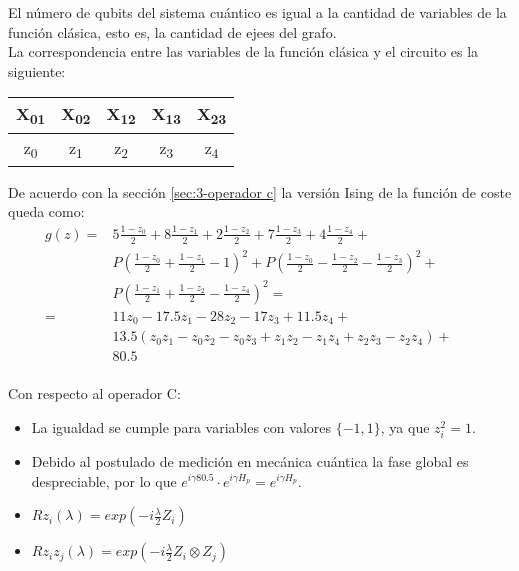 \documentclass{article}
\begin{document}
El número de qubits del sistema cuántico es igual a la cantidad de variables de la función clásica, esto es, la cantidad de ejees del grafo. \\
La correspondencia entre las variables de la función clásica y el circuito es la siguiente:

\begin{center}
  \begin{tabular}{|c|c|c|c|c|}
    \hline
    X\textsubscript{01} & X\textsubscript{02} & X\textsubscript{12} & X\textsubscript{13} & X\textsubscript{23}\\
    \hline
    z\textsubscript{0} & z\textsubscript{1} & z\textsubscript{2} & z\textsubscript{3} & z\textsubscript{4}\\
    \hline
  \end{tabular}
\end{center}

De acuerdo con la sección \ref{sec:3-operador c}  %
la versión Ising de la función de coste queda como:
\begin{align*}
  g(z) = &5\frac{1-z_0}{2} + 8\frac{1-z_1}{2} + 2\frac{1-z_2}{2} + 7\frac{1-z_3}{2} + 4\frac{1-z_4}{2} + &&\\
         &P(\frac{1-z_0}{2} + \frac{1-z_1}{2} - 1)^2 + P(\frac{1-z_0}{2} - \frac{1-z_2}{2} - \frac{1-z_3}{2})^2 + \\
         &P(\frac{1-z_1}{2} + \frac{1-z_2}{2} - \frac{1-z_4}{2})^2 = \\
  = & 11z_0 - 17.5z_1 - 28z_2 - 17z_3 + 11.5z_4 + \\
         &13.5(z_0z_1 - z_0z_2 - z_0z_3 + z_1z_2 - z_1z_4 + z_2z_3 - z_2z_4) + \\
         &80.5 \\
\end{align*}
\par
Con respecto al operador C: \\
\begin{itemize}
\item La igualdad se cumple para variables con valores \(\{-1, 1\}\), ya que \(z_i^2 = 1\). \\
\item Debido al postulado de medición en mecánica cuántica \cite{Nielsen_Chuang_2010} la fase global es despreciable, por lo que
  \(e^{i \gamma 80.5} \cdot e^{i \gamma H_p} = e^{i \gamma H_p}\).
\item \( Rz_i(\lambda) = exp(-i\frac{\lambda}{2}Z_i) \)
\item \( Rz_iz_j(\lambda) = exp(-i\frac{\lambda}{2}Z_i \otimes Z_j) \)
\end{itemize}
\end{document}
